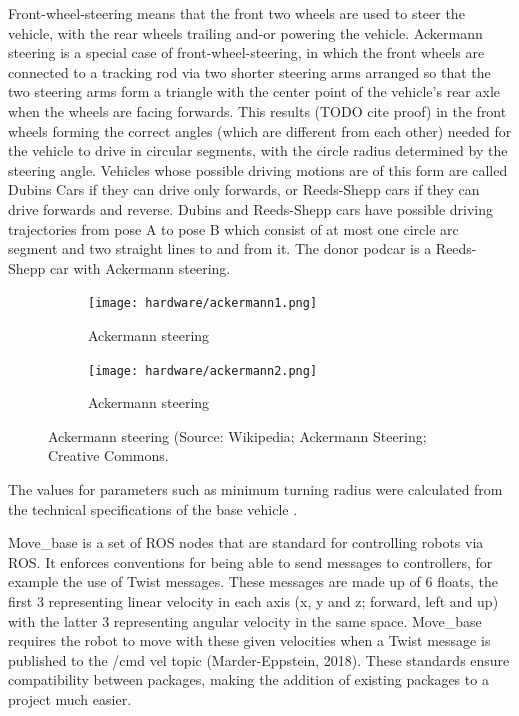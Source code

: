 \documentclass[a4paper]{article}
\begin{document}
Front-wheel-steering means that the front two wheels are used to steer the vehicle, with the rear wheels trailing and-or powering the vehicle. Ackermann steering is a special case of front-wheel-steering, in which the front wheels are connected to a tracking rod via two shorter steering arms arranged so that the two steering arms form a triangle with the center point of the vehicle’s rear axle when the wheels are facing forwards.  This results (TODO cite proof) in the front wheels forming the correct angles (which are different from each other) needed for the vehicle to drive in circular segments, with the circle radius determined by the steering angle. Vehicles whose possible driving motions are of this form are called Dubins Cars if they can drive only forwards, or Reeds-Shepp cars if they can drive forwards and reverse. Dubins and Reeds-Shepp cars have possible driving trajectories from pose A to pose B which consist of at most one circle arc segment and two straight lines to and from it. The donor podcar is a Reeds-Shepp car with Ackermann steering.


\begin{figure}
	\centering
	\begin{subfigure}{0.45\textwidth}
		\centering
		\texttt{[image: hardware/ackermann1.png]}
		\caption{Ackermann steering}
		\label{fig:ackermann1}
	\end{subfigure}	
	\quad
	\begin{subfigure}{0.45\textwidth}
		\centering
		\texttt{[image: hardware/ackermann2.png]}
		\caption{Ackermann steering}
		\label{fig:ackermann2}
	\end{subfigure}
	\caption{Ackermann steering (Source: Wikipedia; Ackermann Steering; Creative Commons.}
\end{figure}


The values for parameters such as minimum turning radius were calculated from the technical specifications of the base vehicle \cite{shopriderflagship}.

Move\_base is a set of ROS nodes that are standard for controlling robots via ROS. It enforces
conventions for being able to send messages to controllers, for example the use of Twist
messages. These messages are made up of 6 floats, the first 3 representing linear velocity in
each axis (x, y and z; forward, left and up) with the latter 3 representing angular velocity in
the same space. Move\_base requires the robot to move with these given velocities when a
Twist message is published to the /cmd vel topic (Marder-Eppstein, 2018). These standards
ensure compatibility between packages, making the addition of existing packages to a project
much easier.
\end{document}
